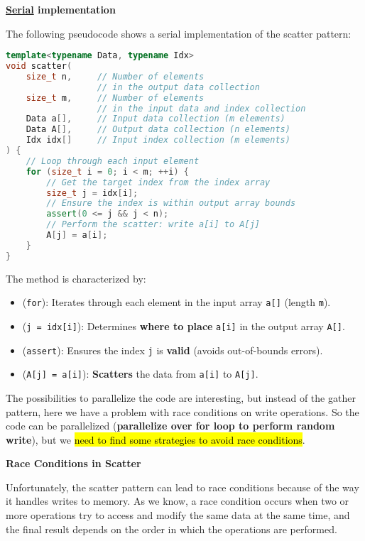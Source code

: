 \highspace
\begin{flushleft}
    \textcolor{Green3}{ \textbf{\underline{Serial} implementation}}
\end{flushleft}
The following pseudocode shows a serial implementation of the scatter pattern:
\begin{lstlisting}[language=c++]
template<typename Data, typename Idx>
void scatter(
    size_t n,     // Number of elements
                  // in the output data collection
    size_t m,     // Number of elements
                  // in the input data and index collection
    Data a[],     // Input data collection (m elements)
    Data A[],     // Output data collection (n elements)
    Idx idx[]     // Input index collection (m elements)
) {
    // Loop through each input element
    for (size_t i = 0; i < m; ++i) {
        // Get the target index from the index array
        size_t j = idx[i];
        // Ensure the index is within output array bounds
        assert(0 <= j && j < n);
        // Perform the scatter: write a[i] to A[j]
        A[j] = a[i];
    }
}
\end{lstlisting}
The method is characterized by:
\begin{itemize}
    \item {} (\texttt{for}): Iterates through each element in the input array \texttt{a[]} (length \texttt{m}).
    \item {} (\texttt{j = idx[i]}): Determines \textbf{where to place} \texttt{a[i]} in the output array \texttt{A[]}.
    \item {} (\texttt{assert}): Ensures the index \texttt{j} is \textbf{valid} (avoids out-of-bounds errors).
    \item {} (\texttt{A[j] = a[i]}): \textbf{Scatters} the data from \texttt{a[i]} to \texttt{A[j]}.
\end{itemize}
The possibilities to parallelize the code are interesting, but instead of the gather pattern, here we have a problem with race conditions on write operations. So the code can be parallelized (\textbf{parallelize over for loop to perform random write}), but we \hl{need to find some strategies to avoid race conditions}.

\highspace
\begin{flushleft}
    \textcolor{Red2}{ \textbf{Race Conditions in Scatter}}
\end{flushleft}
Unfortunately, the scatter pattern can lead to race conditions because of the way it handles writes to memory. As we know, a race condition occurs when two or more operations try to access and modify the same data at the same time, and the final result depends on the order in which the operations are performed.

